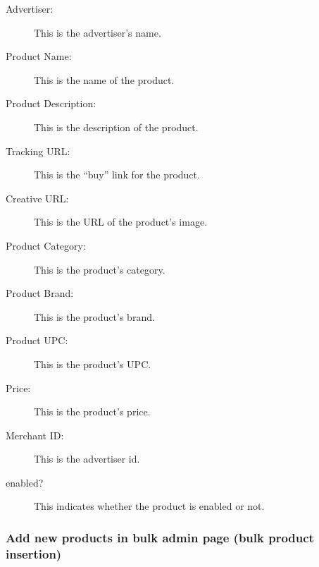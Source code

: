\documentclass[letterpaper]{article}
\begin{document}
\begin{description}
  \item[Advertiser:] This is the advertiser's name.
  \item[Product Name:] This is the name of the product.
  \item[Product Description:] This is the description of the product.
  \item[Tracking URL:] This is the ``buy'' link for the product.
  \item[Creative URL:] This is the URL of the product's image.
  \item[Product Category:] This is the product's category.
  \item[Product Brand:] This is the product's brand.
  \item[Product UPC:] This is the product's UPC.
  \item[Price:] This is the product's price.
  \item[Merchant ID:] This is the advertiser id.
  \item[enabled?] This indicates whether the product is enabled or not.
\end{description}

\subsubsection{Add new products in bulk admin page (bulk product insertion)}
\label{sect:addbulkproducts}
\end{document}
